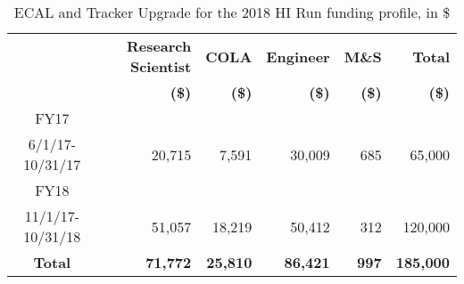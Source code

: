 \begin{table}[hbt]
\begin{center}
\begin{tabular}{|c|r|r|r|r|r|}
\hline
 
                &  \textbf{Research Scientist}  & \textbf{COLA}  & \textbf{Engineer} & \textbf{M\&S}      &  \textbf{Total}\\
                &  \textbf{(\$)}  & \textbf{(\$)}  & \textbf{(\$)} & \textbf{(\$)}      &  \textbf{(\$)}\\ \hline
FY17            &              &        &          &           &         \\
6/1/17-10/31/17  & 20,715      & 7,591  &  30,009  & 685       &  65,000    \\\hline
FY18             &              &        &          &           &         \\
11/1/17-10/31/18  & 51,057    & 18,219   &  50,412     &  312 & 120,000   \\\hline
\textbf{Total}  & \textbf{71,772}    & \textbf{25,810}   &  \textbf{86,421}     &  \textbf{997} & \textbf{185,000} \\\hline
\end{tabular}
\end{center}
\caption{ECAL and Tracker Upgrade for the 2018 HI Run funding profile, in \$}
\label{OpCost}
\end{table}
